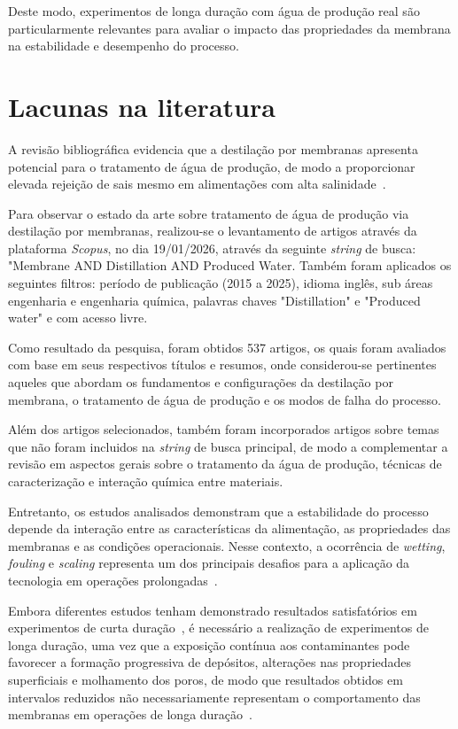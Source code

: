 Deste modo, experimentos de longa duração com água de produção real são particularmente relevantes para avaliar o impacto das propriedades da membrana na estabilidade e desempenho do processo.

\section{Lacunas na literatura}

A revisão bibliográfica evidencia que a destilação por membranas apresenta potencial para o tratamento de água de produção, de modo a proporcionar elevada rejeição de sais mesmo em alimentações com alta salinidade~\cite{Macedonio2014_MD_ProducedWater,Pawar2022AGMD}.

Para observar o estado da arte sobre tratamento de água de produção via destilação por membranas, realizou-se o levantamento de artigos através da plataforma \emph{Scopus}, no dia 19/01/2026, através da seguinte \textit{string} de busca: "Membrane AND Distillation AND Produced Water. Também foram aplicados os seguintes filtros: período de publicação (2015 a 2025), idioma inglês, sub áreas engenharia e engenharia química, palavras chaves "Distillation" e "Produced water" e com acesso livre.

Como resultado da pesquisa, foram obtidos 537 artigos, os quais foram avaliados com base em seus respectivos títulos e resumos, onde considerou-se pertinentes aqueles que abordam os fundamentos e configurações da destilação por membrana, o tratamento de água de produção e os modos de falha do processo.%

Além dos artigos selecionados, também foram incorporados artigos sobre temas que não foram incluidos na \textit{string} de busca principal, de modo a complementar a revisão em aspectos gerais sobre o tratamento da água de produção, técnicas de caracterização e interação química entre materiais.

Entretanto, os estudos analisados demonstram que a estabilidade do processo depende da interação entre as características da alimentação, as propriedades das membranas e as condições operacionais. Nesse contexto, a ocorrência de \textit{wetting}, \textit{fouling} e \textit{scaling} representa um dos principais desafios para a aplicação da tecnologia em operações prolongadas~\cite{Hsieh2021Pretreatments,Nawaz2021FO_MD,Pawar2022AGMD}.

Embora diferentes estudos tenham demonstrado resultados satisfatórios em experimentos de curta duração~\cite{Singh2011DCMD,Macedonio2014_MD_ProducedWater}, é necessário a realização de experimentos de longa duração, uma vez que a exposição contínua aos contaminantes pode favorecer a formação progressiva de depósitos, alterações nas propriedades superficiais e molhamento dos poros, de modo que resultados obtidos em intervalos reduzidos não necessariamente representam o comportamento das membranas em operações de longa duração~\cite{Thakur2020SGMD,Hsieh2021Pretreatments,Abdelrazeq2022DCMD}.

